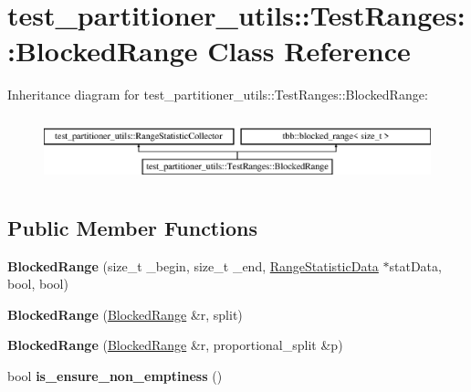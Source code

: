 \hypertarget{classtest__partitioner__utils_1_1TestRanges_1_1BlockedRange}{}\section{test\+\_\+partitioner\+\_\+utils\+:\+:Test\+Ranges\+:\+:Blocked\+Range Class Reference}
\label{classtest__partitioner__utils_1_1TestRanges_1_1BlockedRange}
Inheritance diagram for test\+\_\+partitioner\+\_\+utils\+:\+:Test\+Ranges\+:\+:Blocked\+Range\+:\begin{figure}[H]
\begin{center}
\leavevmode
\includegraphics[height=1.931034cm]{classtest__partitioner__utils_1_1TestRanges_1_1BlockedRange}
\end{center}
\end{figure}
\subsection*{Public Member Functions}
\begin{DoxyCompactItemize}
\item 
\hypertarget{classtest__partitioner__utils_1_1TestRanges_1_1BlockedRange_a99638008f0ca409a3a52cdff0130a97d}{}{\bfseries Blocked\+Range} (size\+\_\+t \+\_\+begin, size\+\_\+t \+\_\+end, \hyperlink{structtest__partitioner__utils_1_1RangeStatisticData}{Range\+Statistic\+Data} $\ast$stat\+Data, bool, bool)\label{classtest__partitioner__utils_1_1TestRanges_1_1BlockedRange_a99638008f0ca409a3a52cdff0130a97d}

\item 
\hypertarget{classtest__partitioner__utils_1_1TestRanges_1_1BlockedRange_a9cca427c5fd4296ed523c9f3a564299a}{}{\bfseries Blocked\+Range} (\hyperlink{classtest__partitioner__utils_1_1TestRanges_1_1BlockedRange}{Blocked\+Range} \&r, split)\label{classtest__partitioner__utils_1_1TestRanges_1_1BlockedRange_a9cca427c5fd4296ed523c9f3a564299a}

\item 
\hypertarget{classtest__partitioner__utils_1_1TestRanges_1_1BlockedRange_a767a2b0f6df71942b9ef7562e24954ad}{}{\bfseries Blocked\+Range} (\hyperlink{classtest__partitioner__utils_1_1TestRanges_1_1BlockedRange}{Blocked\+Range} \&r, proportional\+\_\+split \&p)\label{classtest__partitioner__utils_1_1TestRanges_1_1BlockedRange_a767a2b0f6df71942b9ef7562e24954ad}

\item 
\hypertarget{classtest__partitioner__utils_1_1TestRanges_1_1BlockedRange_ae2280836642fbbf45690d9bdef58110a}{}bool {\bfseries is\+\_\+ensure\+\_\+non\+\_\+emptiness} ()\label{classtest__partitioner__utils_1_1TestRanges_1_1BlockedRange_ae2280836642fbbf45690d9bdef58110a}

\end{DoxyCompactItemize}
